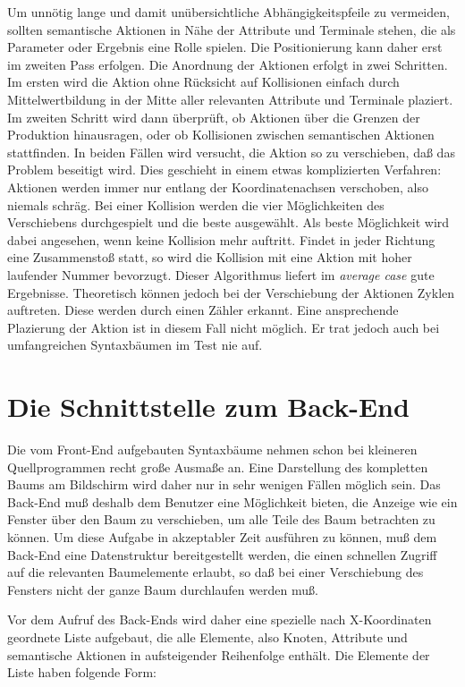 Um unn\"otig lange und damit un\"ubersichtliche Abh\"angigkeitspfeile zu vermeiden, sollten semantische Aktionen in N\"ahe der Attribute und Terminale stehen, die als
Parameter oder Ergebnis eine Rolle spielen. Die Positionierung kann daher erst im zweiten Pass erfolgen. Die Anordnung der Aktionen erfolgt in zwei
Schritten. Im ersten wird die Aktion ohne R\"ucksicht auf Kollisionen einfach durch Mittelwertbildung in der Mitte aller relevanten Attribute und
Terminale plaziert. Im zweiten Schritt wird dann \"uberpr\"uft, ob Aktionen \"uber die Grenzen der Produktion hinausragen, oder ob Kollisionen zwischen
semantischen Aktionen stattfinden. In beiden F\"allen wird versucht, die Aktion so zu verschieben, da\ss{} das Problem beseitigt wird. Dies geschieht in
einem etwas komplizierten Verfahren: Aktionen werden immer nur entlang der Koordinatenachsen verschoben, also niemals schr\"ag. Bei einer Kollision
werden die vier M\"oglichkeiten des Verschiebens durchgespielt und die beste ausgew\"ahlt. Als beste M\"oglichkeit wird dabei angesehen, wenn keine
Kollision mehr auftritt. Findet in jeder Richtung eine Zusammensto\ss{} statt, so wird die Kollision mit eine Aktion mit hoher laufender Nummer bevorzugt.
Dieser Algorithmus liefert im {\it average case} gute Ergebnisse. Theoretisch k\"onnen jedoch bei der Verschiebung der Aktionen Zyklen auftreten.
Diese werden durch einen Z\"ahler erkannt. Eine ansprechende Plazierung der Aktion ist in diesem Fall nicht m\"oglich. Er trat jedoch auch bei
umfangreichen Syntaxb\"aumen im Test nie auf.

\section{Die Schnittstelle zum Back-End}

Die vom Front-End aufgebauten Syntaxb\"aume nehmen schon bei kleineren Quellprogrammen recht gro\ss{}e Ausma\ss{}e an. Eine Darstellung des kompletten Baums am
Bildschirm wird daher nur in sehr wenigen F\"allen m\"oglich sein. Das Back-End mu\ss{} deshalb dem Benutzer eine M\"oglichkeit bieten, die Anzeige wie ein
Fenster \"uber den Baum zu verschieben, um alle Teile des Baum betrachten zu k\"onnen. Um diese Aufgabe in akzeptabler Zeit ausf\"uhren zu k\"onnen, mu\ss{} dem
Back-End eine Datenstruktur bereitgestellt werden, die einen schnellen Zugriff auf die relevanten Baumelemente erlaubt, so da\ss{} bei einer Verschiebung
des Fensters nicht der ganze Baum durchlaufen werden mu\ss{}.

Vor dem Aufruf des Back-Ends wird daher eine spezielle nach X-Koordinaten geordnete Liste aufgebaut, die alle Elemente, also Knoten, Attribute und semantische
Aktionen in aufsteigender Reihenfolge enth\"alt. Die Elemente der Liste haben folgende Form:

